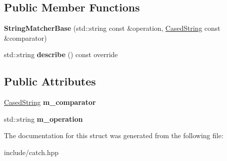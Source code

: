 \subsection*{Public Member Functions}
\begin{DoxyCompactItemize}
\item 
{\bfseries String\+Matcher\+Base} (std\+::string const \&operation, \hyperlink{structCatch_1_1Matchers_1_1StdString_1_1CasedString}{Cased\+String} const \&comparator)\hypertarget{structCatch_1_1Matchers_1_1StdString_1_1StringMatcherBase_a3a9b66bae298ae27058478529b4bb39d}{}\label{structCatch_1_1Matchers_1_1StdString_1_1StringMatcherBase_a3a9b66bae298ae27058478529b4bb39d}

\item 
std\+::string {\bfseries describe} () const override\hypertarget{structCatch_1_1Matchers_1_1StdString_1_1StringMatcherBase_a47af030f8cea42a601ffb1000eea5cca}{}\label{structCatch_1_1Matchers_1_1StdString_1_1StringMatcherBase_a47af030f8cea42a601ffb1000eea5cca}

\end{DoxyCompactItemize}
\subsection*{Public Attributes}
\begin{DoxyCompactItemize}
\item 
\hyperlink{structCatch_1_1Matchers_1_1StdString_1_1CasedString}{Cased\+String} {\bfseries m\+\_\+comparator}\hypertarget{structCatch_1_1Matchers_1_1StdString_1_1StringMatcherBase_a17c9f0fe40587070ffe998c193742831}{}\label{structCatch_1_1Matchers_1_1StdString_1_1StringMatcherBase_a17c9f0fe40587070ffe998c193742831}

\item 
std\+::string {\bfseries m\+\_\+operation}\hypertarget{structCatch_1_1Matchers_1_1StdString_1_1StringMatcherBase_a7a25c4b7d863e9a1c406d81efd0f83ca}{}\label{structCatch_1_1Matchers_1_1StdString_1_1StringMatcherBase_a7a25c4b7d863e9a1c406d81efd0f83ca}

\end{DoxyCompactItemize}


The documentation for this struct was generated from the following file\+:\begin{DoxyCompactItemize}
\item 
include/catch.\+hpp\end{DoxyCompactItemize}
